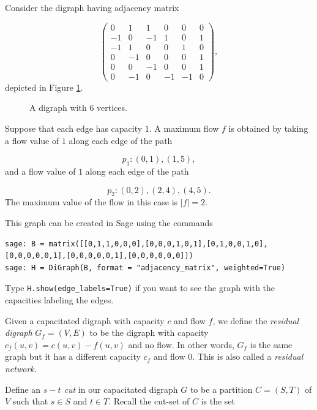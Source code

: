 \begin{example}
{\rm
Consider the digraph having adjacency matrix

\[
\left(\begin{array}{cccccc}
0 & 1 & 1 & 0 & 0 & 0 \\
-1 & 0 & -1 & 1 & 0 & 1 \\
-1 & 1 & 0 & 0 & 1 & 0 \\
0 & -1 & 0 & 0 & 0 & 1 \\
0 & 0 & -1 & 0 & 0 & 1 \\
0 & -1 & 0 & -1 & -1 & 0
\end{array}\right),
\]
depicted in Figure \ref{fig:digraph-flow1}.

\begin{figure}[!htbp]
\centering

\caption{A digraph with $6$ vertices.}
\label{fig:digraph-flow1}
\end{figure}
Suppose that each edge has capacity $1$.
A maximum flow $f$ is obtained by taking a flow value
of $1$ along each edge of the path

\[
p_1:(0,1),(1,5),
\]
and a flow value
of $1$ along each edge of the path

\[
p_2:(0,2),(2,4),(4,5).
\]
The maximum value of the flow in this case is $|f|=2$.

This graph can be created in Sage using the commands

\begin{lstlisting}
sage: B = matrix([[0,1,1,0,0,0],[0,0,0,1,0,1],[0,1,0,0,1,0],[0,0,0,0,0,1],[0,0,0,0,0,1],[0,0,0,0,0,0]])
sage: H = DiGraph(B, format = "adjacency_matrix", weighted=True)
\end{lstlisting}

\noindent
Type {\tt H.show(edge\_labels=True)} if you want to see the graph with
the capacities labeling the edges.


}
\end{example}


Given a capacitated digraph with capacity $c$ and flow $f$,
we define the {\it residual digraph} $G_f=(V,E)$ to be the
digraph with capacity $c_f(u,v) = c(u,v) - f(u,v)$ and no flow.
In other words, $G_f$ is the same graph but it has a different
capacity $c_f$ and flow $0$.
This is also called a {\it residual network}.

Define an {\it $s-t$ cut} in our capacitated digraph $G$
to be a partition $C = (S,T)$ of $V$ such that
$s \in S$ and $t\in T$.
Recall the cut-set of $C$ is the set

